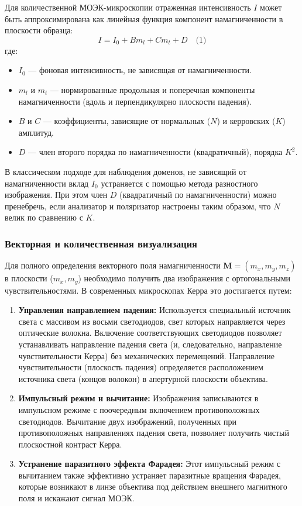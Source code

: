 \documentclass[12pt,a4paper]{article}
\numberwithin{equation}{section}
\begin{document}
Для количественной МОЭК-микроскопии отраженная интенсивность $I$ может быть аппроксимирована как линейная функция компонент намагниченности в плоскости образца:
$$
I = I_0 + Bm_l + Cm_t + D \quad \text{(1)}
$$
где:
\begin{itemize}
    \item $I_0$ — фоновая интенсивность, не зависящая от намагниченности.
    \item $m_l$ и $m_t$ — нормированные продольная и поперечная компоненты намагниченности (вдоль и перпендикулярно плоскости падения).
    \item $B$ и $C$ — коэффициенты, зависящие от нормальных ($N$) и керровских ($K$) амплитуд.
    \item $D$ — член второго порядка по намагниченности (квадратичный), порядка $K^2$.
\end{itemize}
В классическом подходе для наблюдения доменов, не зависящий от намагниченности вклад $I_0$ устраняется с помощью метода разностного изображения. При этом член $D$ (квадратичный по намагниченности) можно пренебречь, если анализатор и поляризатор настроены таким образом, что $N$ велик по сравнению с $K$.

\subsubsection{Векторная и количественная визуализация}
Для полного определения векторного поля намагниченности $\mathbf{M} = (m_x, m_y, m_z)$ в плоскости ($m_x, m_y$) необходимо получить два изображения с ортогональными чувствительностями. В современных микроскопах Керра это достигается путем:
\begin{enumerate}
    \item \textbf{Управления направлением падения:} Используется специальный источник света с массивом из восьми светодиодов, свет которых направляется через оптические волокна. Включение соответствующих светодиодов позволяет устанавливать направление падения света (и, следовательно, направление чувствительности Керра) без механических перемещений. Направление чувствительности (плоскость падения) определяется расположением источника света (концов волокон) в апертурной плоскости объектива.
    \item \textbf{Импульсный режим и вычитание:} Изображения записываются в импульсном режиме с поочередным включением противоположных светодиодов. Вычитание двух изображений, полученных при противоположных направлениях падения света, позволяет получить чистый плоскостной контраст Керра.
    \item \textbf{Устранение паразитного эффекта Фарадея:} Этот импульсный режим с вычитанием также эффективно устраняет паразитные вращения Фарадея, которые возникают в линзе объектива под действием внешнего магнитного поля и искажают сигнал МОЭК.
\end{enumerate}
\end{document}
